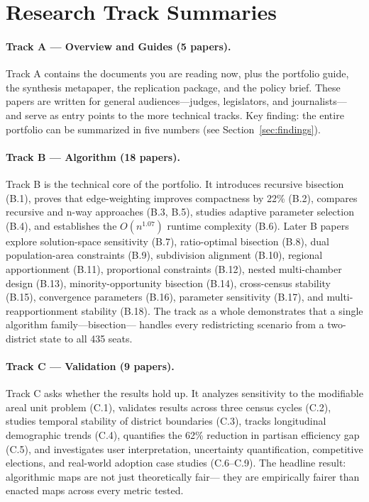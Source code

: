 
\section{Research Track Summaries}

\paragraph{Track A --- Overview and Guides (5 papers).}
Track A contains the documents you are reading now, plus the portfolio guide,
the synthesis metapaper, the replication package, and the policy brief.
These papers are written for general audiences---judges, legislators, and journalists---
and serve as entry points to the more technical tracks.
Key finding: the entire portfolio can be summarized in five numbers
(see Section~\ref{sec:findings}).

\paragraph{Track B --- Algorithm (18 papers).}
Track B is the technical core of the portfolio.
It introduces recursive bisection (B.1), proves that edge-weighting
improves compactness by 22\% (B.2), compares recursive and n-way approaches
(B.3, B.5), studies adaptive parameter selection (B.4), and establishes
the $O(n^{1.07})$ runtime complexity (B.6).
Later B papers explore solution-space sensitivity (B.7), ratio-optimal
bisection (B.8), dual population-area constraints (B.9), subdivision
alignment (B.10), regional apportionment (B.11), proportional constraints
(B.12), nested multi-chamber design (B.13), minority-opportunity bisection (B.14),
cross-census stability (B.15), convergence parameters (B.16), parameter
sensitivity (B.17), and multi-reapportionment stability (B.18).
The track as a whole demonstrates that a single algorithm family---bisection---
handles every redistricting scenario from a two-district state to all 435 seats.

\paragraph{Track C --- Validation (9 papers).}
Track C asks whether the results hold up.
It analyzes sensitivity to the modifiable areal unit problem (C.1),
validates results across three census cycles (C.2), studies temporal
stability of district boundaries (C.3), tracks longitudinal demographic
trends (C.4), quantifies the 62\% reduction in partisan efficiency gap (C.5),
and investigates user interpretation, uncertainty quantification, competitive
elections, and real-world adoption case studies (C.6--C.9).
The headline result: algorithmic maps are not just theoretically fair---
they are empirically fairer than enacted maps across every metric tested.

